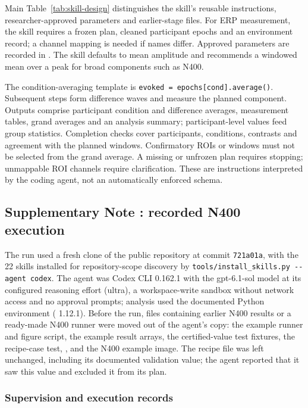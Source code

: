Main Table~\ref*{tab:skill-design} distinguishes the skill's reusable instructions, researcher-approved parameters and earlier-stage files. For ERP measurement, the skill requires a frozen plan, cleaned participant epochs and an environment record; a channel mapping is needed if names differ. Approved parameters are recorded in . The skill defaults to mean amplitude and recommends a windowed mean over a peak for broad components such as N400.

The condition-averaging template is \texttt{evoked = epochs[cond].average()}. Subsequent steps form difference waves and measure the planned component. Outputs comprise participant condition and difference averages, measurement tables, grand averages and an analysis summary; participant-level values feed group statistics. Completion checks cover participants, conditions, contrasts and agreement with the planned windows. Confirmatory ROIs or windows must not be selected from the grand average. A missing or unfrozen plan requires stopping; unmappable ROI channels require clarification. These are instructions interpreted by the coding agent, not an automatically enforced schema.

\FloatBarrier
{}
\subsection*{Supplementary Note \thesuppnote: recorded N400 execution}
\label{si:recorded}

The run used a fresh clone of the public repository at commit \texttt{721a01a}, with the 22 skills installed for repository-scope discovery by \verb|tools/install_skills.py --agent codex|. The agent was Codex CLI 0.162.1 with the gpt-6.1-sol model at its configured reasoning effort (ultra), a workspace-write sandbox without network access and no approval prompts; analysis used the documented Python environment (\mne{} 1.12.1). Before the run, files containing earlier N400 results or a ready-made N400 runner were moved out of the agent's copy: the example runner and figure script, the example result arrays, the certified-value test fixtures, the recipe-case test, ,  and the N400 example image. The recipe file was left unchanged, including its documented validation value; the agent reported that it saw this value and excluded it from its plan.

\subsubsection*{Supervision and execution records}


